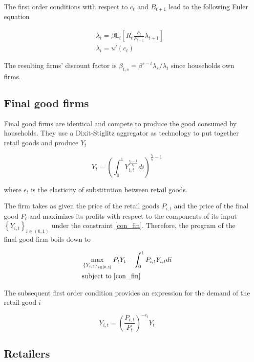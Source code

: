 The first order conditions with respect to $c_t$ and $B_{t+1}$ lead to the following Euler equation

\begin{align}
&\lambda_t = \beta \mathbb{E}_t \left[ R_{t} \frac{P_t}{P_{t+1}} \lambda_{t+1} \right] \label{eq:euler_eq}\\
&\lambda_t = u' \left( c_t \right)\label{eq:def_um}
\end{align}

The resulting firms' discount factor is $\beta_{t,s} = \beta^{s-t} \lambda_s / \lambda_t$ since households own firms.

\subsection{Final good firms}

Final good firms are identical and compete to produce the good consumed by households. They use a Dixit-Stiglitz aggregator as technology to put together retail goods and produce $Y_t$

\begin{equation}
Y_t = \left( \int_{0}^{1} Y_{i,t}^{\frac{\epsilon_t - 1}{\epsilon_t}} di \right)^{\frac{\epsilon_t}{\epsilon_t} - 1} \label{con_fin}
\end{equation}

where $\epsilon_t$ is the elasticity of substitution between retail goods.

The firm takes as given the price of the retail goods $P_{i,t}$ and the price of the final good $P_t$ and maximizes its profits with respect to the components of its input $\left\{Y_{i,t}\right\}_{i\in(0,1)}$ under the constraint \eqref{con_fin}. Therefore, the program of the final good firm boils down to

\begin{align*}
&\max_{\left\{Y_{i,t}\right\}_{i\in[0,1]}} P_t Y_t - \int_{0}^{1} P_{i,t} Y_{i,t} di\\
&\text{subject to \eqref{con_fin}}
\end{align*}

The subsequent first order condition provides an expression for the demand of the retail good $i$

\begin{equation}
Y_{i,t} = \left( \frac{P_{i,t}}{P_t} \right)^{-\epsilon_t} Y_t \label{ret_dem}
\end{equation}

\subsection{Retailers}

